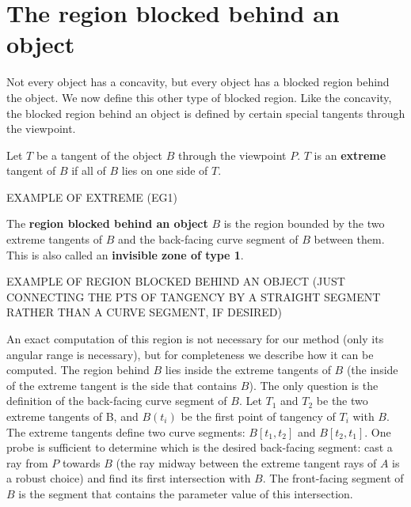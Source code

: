 \documentclass[12pt]{article}
\begin{document}
\section{The region blocked behind an object}

Not every object has a concavity, but every object has a blocked region behind the object.
We now define this other type of blocked region.
Like the concavity,
the blocked region behind an object is defined by certain 
special tangents through the viewpoint.

\begin{defn2}
Let $T$ be a tangent of the object $B$ through the viewpoint $P$.
$T$ is an {\bf extreme} tangent of $B$ if all of $B$ lies on one side of $T$.
\end{defn2}

EXAMPLE OF EXTREME (EG1) 

\begin{defn2}
The {\bf region blocked behind an object} $B$ is the region bounded by 
the two extreme tangents of $B$ and the back-facing curve segment of $B$ between them.
This is also called an {\bf invisible zone of type 1}.
\end{defn2}

EXAMPLE OF REGION BLOCKED BEHIND AN OBJECT (JUST CONNECTING THE PTS OF TANGENCY
BY A STRAIGHT SEGMENT RATHER THAN A CURVE SEGMENT, IF DESIRED)


An exact computation of this region is not necessary for our method
(only its angular range is necessary), but for completeness we describe
how it can be computed.
The region behind $B$ lies inside the extreme tangents of $B$
(the inside of the extreme tangent is the side that contains $B$).
The only question is the definition of the back-facing curve segment of $B$.
Let $T_1$ and $T_2$ be the two extreme tangents of B, and
$B(t_i)$ be the first point of tangency of $T_i$ with $B$.
The extreme tangents define two curve segments: 
$B[t_1,t_2]$ and $B[t_2,t_1]$.
One probe is sufficient to determine which is the desired back-facing segment:
cast a ray from $P$ towards $B$ 
(the ray midway between the extreme tangent rays of $A$ is a robust choice)
and find its first intersection with $B$.  
The front-facing segment of $B$ is the segment that contains the parameter value
of this intersection.
\end{document}
